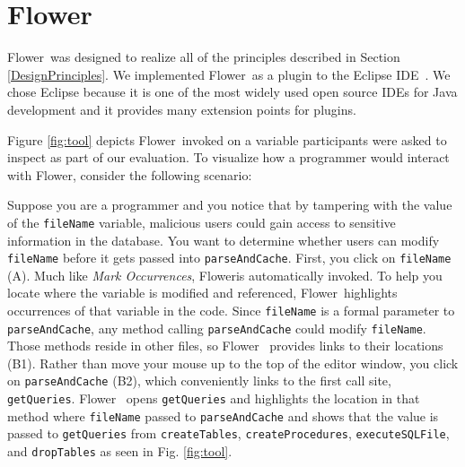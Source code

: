\documentclass[conference]{IEEEtran}
\newcommand{\toolName}{Flower}
\begin{document}
\section{\toolName}
\toolName~was designed to realize all of the principles described in Section \ref{DesignPrinciples}. 
We implemented \toolName~as a plugin to the Eclipse IDE~\cite{Eclipse}. 
We chose Eclipse because it is one of the most widely used open source IDEs for Java development and it provides many extension points for plugins. 

Figure \ref{fig:tool} depicts \toolName~invoked on a variable participants were asked to inspect as part of our evaluation. To visualize how a programmer would interact with \toolName, consider the following scenario:


Suppose you are a programmer and you notice that by tampering with the value of the \texttt{fileName} variable, malicious users could gain access to sensitive information in the database. 
You want to determine whether users can modify \texttt{fileName} before it gets passed into \texttt{parseAndCache}. 
First, you click on \texttt{fileName} (A).
Much like \emph{Mark Occurrences}, \toolName is automatically invoked.
To help you locate where the variable is modified and referenced, \toolName~highlights occurrences of that variable in the code.
Since \texttt{fileName} is a formal parameter to \texttt{parseAndCache}, any method calling \texttt{parseAndCache} could modify \texttt{fileName}. 
Those methods reside in other files, so \toolName~ provides links to their locations (B1).
Rather than move your mouse up to the top of the editor window, you click on \texttt{parseAndCache} (B2), which conveniently links to the first call site, \texttt{getQueries}. 
\toolName~ opens \texttt{getQueries} and highlights the location in that method where \texttt{fileName} passed to \texttt{parseAndCache} and shows that the value is passed to \texttt{getQueries} from \texttt{createTables}, \texttt{createProcedures}, \texttt{executeSQLFile}, and \texttt{dropTables} as seen in Fig. \ref{fig:tool}.  

\end{document}
